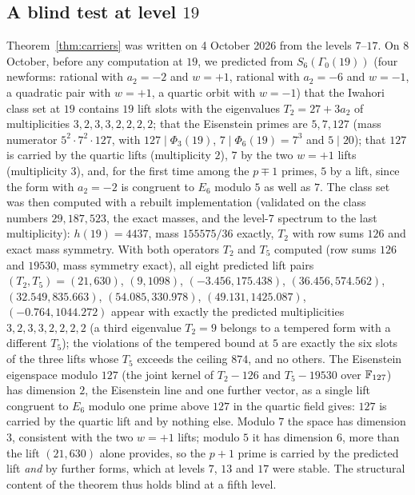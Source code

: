 \documentclass[11pt]{amsart}
\theoremstyle{definition}
\begin{document}
\subsection{A blind test at level $19$}\label{sec:19}
Theorem~\ref{thm:carriers} was written on 4 October 2026 from the levels $7$--$17$. On 8 October, before any computation at $19$, we predicted from $S_6(\Gamma_0(19))$ (four newforms: rational with $a_2=-2$ and $w=+1$, rational with $a_2=-6$ and $w=-1$, a quadratic pair with $w=+1$, a quartic orbit with $w=-1$) that the Iwahori class set at $19$ contains $19$ lift slots with the eigenvalues $T_2=27+3a_2$ of multiplicities $3,2,3,3,2,2,2,2$; that the Eisenstein primes are $5,7,127$ (mass numerator $5^2\cdot7^2\cdot127$, with $127\mid\Phi_3(19)$, $7\mid\Phi_6(19)=7^3$ and $5\mid 20$); that $127$ is carried by the quartic lifts (multiplicity $2$), $7$ by the two $w=+1$ lifts (multiplicity $3$), and, for the first time among the $p\mp1$ primes, $5$ by a lift, since the form with $a_2=-2$ is congruent to $E_6$ modulo $5$ as well as $7$. The class set was then computed with a rebuilt implementation (validated on the class numbers $29,187,523$, the exact masses, and the level-$7$ spectrum to the last multiplicity): $h(19)=4437$, mass $155575/36$ exactly, $T_2$ with row sums $126$ and exact mass symmetry. With both operators $T_2$ and $T_5$ computed (row sums $126$ and $19530$, mass symmetry exact), all eight predicted lift pairs $(T_2,T_5)=(21,630)$, $(9,1098)$, $(-3.456,175.438)$, $(36.456,574.562)$, $(32.549,835.663)$, $(54.085,330.978)$, $(49.131,1425.087)$, $(-0.764,1044.272)$ appear with exactly the predicted multiplicities $3,2,3,3,2,2,2,2$ (a third eigenvalue $T_2=9$ belongs to a tempered form with a different $T_5$); the violations of the tempered bound at $5$ are exactly the six slots of the three lifts whose $T_5$ exceeds the ceiling $874$, and no others. The Eisenstein eigenspace modulo $127$ (the joint kernel of $T_2-126$ and $T_5-19530$ over $\mathbb{F}_{127}$) has dimension $2$, the Eisenstein line and one further vector, as a single lift congruent to $E_6$ modulo one prime above $127$ in the quartic field gives: $127$ is carried by the quartic lift and by nothing else. Modulo $7$ the space has dimension $3$, consistent with the two $w=+1$ lifts; modulo $5$ it has dimension $6$, more than the lift $(21,630)$ alone provides, so the $p+1$ prime is carried by the predicted lift \emph{and} by further forms, which at levels $7$, $13$ and $17$ were stable. The structural content of the theorem thus holds blind at a fifth level.
\end{document}
